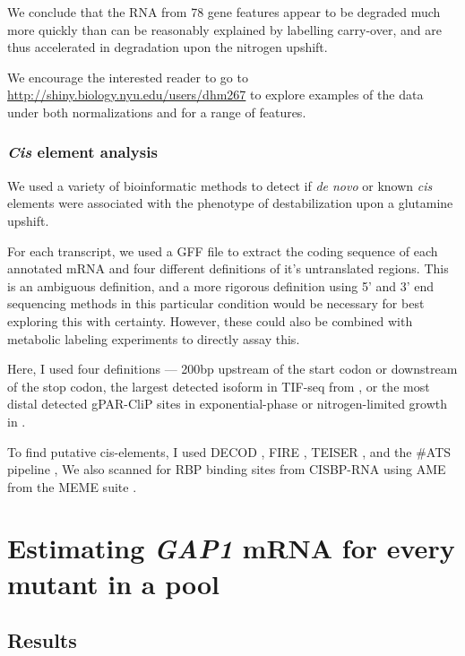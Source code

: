 {We conclude that the RNA from 78 gene
features appear to be degraded much more quickly than can be reasonably
explained by labelling carry-over, and are thus accelerated in
degradation upon the nitrogen upshift.

We encourage the interested reader to go to
\url{http://shiny.biology.nyu.edu/users/dhm267} to explore examples of
the data under both normalizations and for a range of features.

\subsubsection{\textit{Cis} element analysis}

We used a variety of bioinformatic methods to detect if \emph{de novo}
or known \emph{cis} elements were associated with the phenotype of
destabilization upon a glutamine upshift.

For each transcript, we used a GFF file to extract the coding sequence
of each annotated mRNA and four different definitions of it's
untranslated regions. This is an ambiguous definition, and a more
rigorous definition using 5' and 3' end sequencing methods in this
particular condition would be necessary for best exploring this with
certainty. However, these could also be combined with metabolic
labeling experiments \parencite{gupta2014alternative} to directly
assay this. 

Here, I used four definitions --- 
200bp upstream of the start codon or downstream
of the stop codon, the largest detected isoform in TIF-seq from
\parencite{pelechano2014genome}, 
or the most distal detected gPAR-CliP sites in
exponential-phase or nitrogen-limited growth in 
\parencite{freeberg2013pervasive}.

To find putative cis-elements, 
I used DECOD \parencite{huggins2011decod}, 
FIRE \parencite{elemento2007universal},
TEISER \parencite{goodarzi2012systematic},
and the \#ATS pipeline \parencite{li2010predicting},
We also scanned for RBP binding sites from
CISBP-RNA \parencite{ray2013compendium}
using AME from the MEME suite \parencite{mcleay2010motif}.


\section{Estimating \textit{GAP1} mRNA for every mutant in a pool}

\subsection{Results}

}
